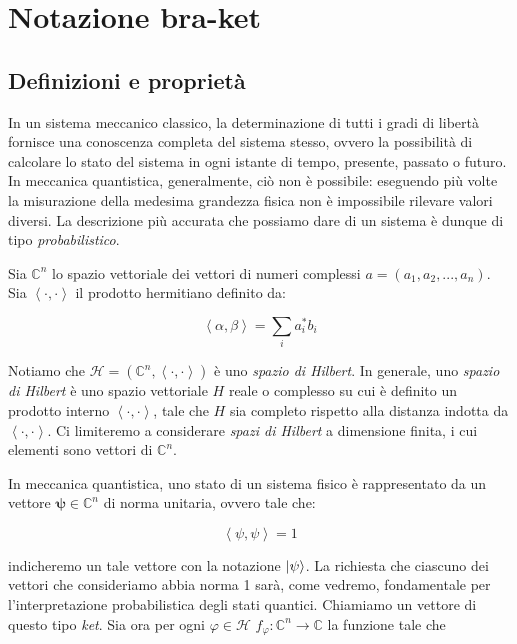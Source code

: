 \section{Notazione bra-ket}

\subsection{Definizioni e proprietà}

	In un sistema meccanico classico, la determinazione di tutti i gradi di libertà fornisce una conoscenza completa del sistema stesso, ovvero la possibilità di calcolare lo stato del sistema in ogni istante di tempo, presente, passato o futuro. In meccanica quantistica, generalmente, ciò non è possibile: eseguendo più volte la misurazione della medesima grandezza fisica non è impossibile rilevare valori diversi. La descrizione più accurata che possiamo dare di un sistema è dunque di tipo \textit{probabilistico}.

Sia $\mathbb{C}^n$ lo spazio vettoriale dei vettori di numeri complessi $a = (a_1, a_2, ..., a_n)$. Sia $\left \langle \cdot, \cdot \right \rangle$ il prodotto hermitiano definito da:

	\begin{equation} \label{eq:innerProduct}
		\left \langle \alpha, \beta \right \rangle = \sum_{i} a_i^{*} b_i
	\end{equation}

Notiamo che $\mathcal{H}= (\mathbb{C}^n, \left \langle \cdot, \cdot \right \rangle)$ è uno \textit{spazio di Hilbert}. In generale, uno \textit{spazio di Hilbert} \`e uno spazio vettoriale $H$ reale o complesso su cui \`e definito un prodotto interno $\left \langle \cdot, \cdot \right \rangle$, tale che $H$ sia completo rispetto alla distanza indotta da $\left \langle \cdot, \cdot \right \rangle$. Ci limiteremo a considerare \textit{spazi di Hilbert} a dimensione finita, i cui elementi sono vettori di $\mathbb{C}^n$.

In meccanica quantistica, uno stato di un sistema fisico \`e rappresentato da un vettore $\mathbf{\psi} \in \mathbb{C}^n$ di norma unitaria, ovvero tale che:

	\[
		\left \langle \psi, \psi \right \rangle = 1
	\]

indicheremo un tale vettore con la notazione $\ket{\psi}$. La richiesta che ciascuno dei vettori che consideriamo abbia norma 1 sarà, come vedremo, fondamentale per l'interpretazione probabilistica degli stati quantici. Chiamiamo un vettore di questo tipo \textit{ket}. Sia ora per ogni $\varphi \in \mathcal{H}$ $f_{\varphi} : \mathbb{C}^n \rightarrow \mathbb{C}$ la funzione tale che 

